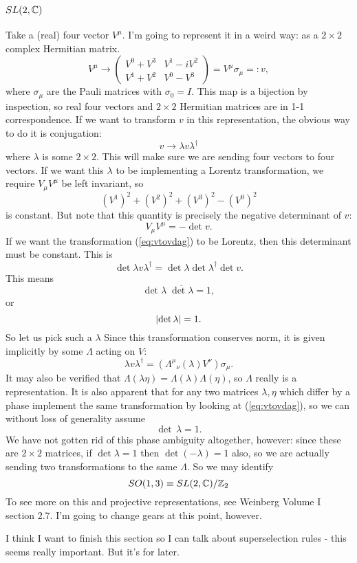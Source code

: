 \documentclass[main.tex]{subfiles}
\begin{document}
\subsection{$SL(2,\mathbb{C})$}
Take a (real) four vector $V^\mu$. I'm going to represent it in a weird way: as a $2 \times 2$ complex Hermitian matrix.
\begin{equation}
V^\mu \to \begin{pmatrix}
V^0 + V^3 & V^1 - iV^2 \\
V^1 + V^2 & V^0 - V^3
\end{pmatrix} = V^\mu \sigma_\mu =: v,
\end{equation}
where $\sigma_\mu$ are the Pauli matrices with $\sigma_0 = I$. This map is a bijection by inspection, so real four vectors and $2\times 2$ Hermitian matrices are in 1-1 correspondence. If we want to transform $v$ in this representation, the obvious way to do it is conjugation:
\begin{equation} \label{eq:vtovdag}
v \to \lambda v \lambda^\dagger
\end{equation}
where $\lambda$ is some $2\times 2$. This will make sure we are sending four vectors to four vectors. If we want this $\lambda$ to be implementing a Lorentz transformation, we require $V_\mu V^\mu$ be left invariant, so 
\[
(V^1)^2 + (V^2)^2 + (V^3)^2 - (V^0)^2 
\]
is constant. But note that this quantity is precisely the negative determinant of $v$:
\[
V_\mu V^\mu = - \det v.
\]
If we want the transformation (\ref{eq:vtovdag}) to be Lorentz, then this determinant must be constant. This is
\[
\det{\lambda v \lambda^{\dagger}} = \det {\lambda} \det{\lambda^\dagger} \det v.
\]
This means
\[
\det \lambda \; \overline{\det \lambda} = 1,
\]
or
\[
\abs{\det \lambda} = 1.
\]
So let us pick such a $\lambda$ Since this transformation conserves norm, it is given implicitly by some $\Lambda$ acting on $V$:
\[
\lambda v \lambda^\dagger = ({\Lambda^\mu}_\nu (\lambda) V^\nu)\sigma_\mu.
\]
It may also be verified that $\Lambda(\lambda \eta) = \Lambda(\lambda) \Lambda(\eta)$, so $\Lambda$ really is a representation. It is also apparent that for any two matrices $\lambda,\eta$ which differ by a phase implement the same transformation by looking at (\ref{eq:vtovdag}), so we can without loss of generality assume
\[
\det \, \lambda = 1.
\]
We have not gotten rid of this phase ambiguity altogether, however: since these are $2\times 2$ matrices, if $\det \lambda = 1$ then $\det (-\lambda) = 1$ also, so we are actually sending two transformations to the same $\Lambda$. So we may identify 
\[
SO(1,3) \equiv SL(2,\mathbb{C})/\mathbb{Z}_2
\]
To see more on this and projective representations, see Weinberg Volume I section 2.7. I'm going to change gears at this point, however.

I think I want to finish this section so I can talk about superselection rules - this seems really important. But it's for later.
\end{document}
